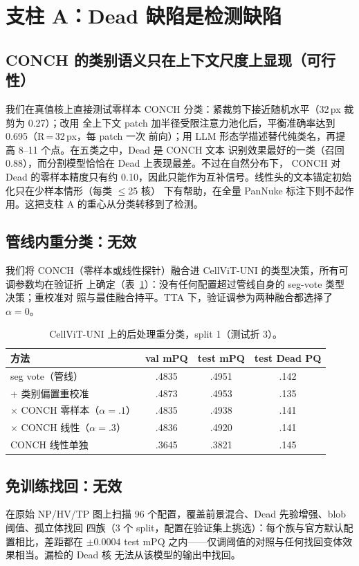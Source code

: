 \documentclass[11pt]{article}
\begin{document}
\section{支柱 A：Dead 缺陷是检测缺陷}
\label{sec:pillarA}

\subsection{CONCH 的类别语义只在上下文尺度上显现（可行性）}
我们在真值核上直接测试零样本 CONCH 分类：紧裁剪下接近随机水平（32\,px 裁剪为 0.27）；改用
全上下文 patch 加半径受限注意力池化后，平衡准确率达到 0.695（R\,=\,32\,px，每 patch 一次
前向）；用 LLM 形态学描述替代纯类名，再提高 8--11 个点。在五类之中，Dead 是 CONCH 文本
识别效果最好的一类（召回 0.88），而分割模型恰恰在 Dead 上表现最差。不过在自然分布下，
CONCH 对 Dead 的零样本精度只有约 0.10，因此只能作为互补信号。线性头的文本锚定初始化只在少样本情形（每类 $\le$25 核）
下有帮助，在全量 PanNuke 标注下则不起作用。这把支柱 A 的重心从分类转移到了检测。

\subsection{管线内重分类：无效}
我们将 CONCH（零样本或线性探针）融合进 CellViT-UNI 的类型决策，所有可调参数均在验证折
上确定（表~\ref{tab:retype}）：没有任何配置超过管线自身的 seg-vote 类型决策；重校准对
照与最佳融合持平。TTA 下，验证调参为两种融合都选择了 $\alpha=0$。

\begin{table}[t]
\centering\small
\caption{CellViT-UNI 上的后处理重分类，split 1（测试折 3）。}
\label{tab:retype}
\begin{tabular}{lccc}
\toprule
方法 & val mPQ & test mPQ & test Dead PQ \\
\midrule
seg vote（管线）                 & .4835 & .4951 & .142 \\
+ 类别偏置重校准                 & .4873 & .4953 & .135 \\
$\times$ CONCH 零样本（$\alpha{=}.1$） & .4835 & .4938 & .141 \\
$\times$ CONCH 线性（$\alpha{=}.3$）    & .4836 & .4920 & .141 \\
CONCH 线性单独                   & .3645 & .3821 & .145 \\
\bottomrule
\end{tabular}
\end{table}

\subsection{免训练找回：无效}
在原始 NP/HV/TP 图上扫描 96 个配置，覆盖前景混合、Dead 先验增强、blob 阈值、孤立体找回
四族（3 个 split，配置在验证集上挑选）：每个族与官方默认配置相比，差距都在
$\pm0.0004$ test mPQ 之内——仅调阈值的对照与任何找回变体效果相当。漏检的 Dead 核
无法从该模型的输出中找回。
\end{document}
